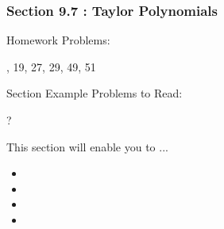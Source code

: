 %
%

\begin{frame}
\frametitle{\LARGE {\color[rgb]{0.02,0.20,1.0} Section 9.7 : Taylor Polynomials}}
\vspace{0.8cm}
\begin{block}{Homework Problems:}

\vspace{0.2cm}
, 19, 27, 29, 49, 
51
	
\end{block}
\vspace{0.5cm}

\begin{block}{Section Example Problems to Read:}

\vspace{0.2cm}
\centering
?
\end{block}
\vspace{0.3cm}

\begin{block}{This section will enable you to ...}
\begin{itemize}
	\item[...] 
	\item[...] 
	\item[...] 
	\item[...] 
\end{itemize}
\end{block}
\vspace{3.0cm}
\end{frame}
